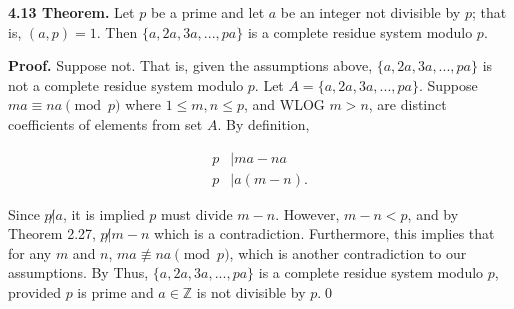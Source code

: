 \documentclass[12pt]{article}
\begin{document}
\noindent\textbf{4.13 Theorem.} Let $p$ be a prime and let $a$ be an integer not divisible by $p$; that is, $(a,p)=1$. Then $\{a,2a,3a,...,pa\}$ is a complete residue system modulo $p$.

\bigskip

\noindent\textbf{Proof.} Suppose not. That is, given the assumptions above, $\{a,2a,3a,...,pa\}$ is not a complete residue system modulo $p$. Let $A=\{a,2a,3a,...,pa\}$. Suppose $ma\equiv na\pmod p$ where $1\leq m,n \leq p$, and WLOG $m>n$, are distinct coefficients of elements from set $A$. By definition,

\begin{align*}
p&|ma - na\\
p&|a(m-n).
\end{align*}

Since $p\not|a$, it is implied $p$ must divide $m-n$. However, $m-n < p$, and by Theorem 2.27, $p\not|m-n$ which is a contradiction. Furthermore, this implies that for any $m$ and $n$, $ma\not\equiv na\pmod p$, which is another contradiction to our assumptions. By Thus, $\{a,2a,3a,...,pa\}$ is a complete residue system modulo $p$, provided $p$ is prime and $a\in\mathbb{Z}$ is not divisible by $p$.\qed
\end{document}
